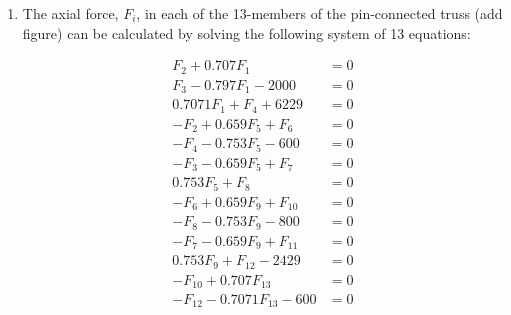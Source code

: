 \begin{fullwidth}
\begin{enumerate}[resume]
\item The axial force, $F_i$, in each of the 13-members of the pin-connected truss (add figure) can be calculated by solving the following system of 13 equations:

\begin{align*}
F_2 + 0.707 F_1 &= 0 \\
F_3 - 0.797 F_1 - 2000 &= 0 \\
0.7071 F_1 + F_4 + 6229 &= 0 \\
-F_2 + 0.659F_5 + F_6 &= 0 \\
-F_4 - 0.753 F_5 - 600 &= 0 \\
-F_3 - 0.659 F_5 + F_7 &= 0 \\
0.753 F_5 + F_8 &= 0 \\
-F_6 + 0.659 F_9 + F_{10} &= 0 \\
-F_8 - 0.753 F_9 - 800 &= 0 \\
-F_7 -0.659 F_9 + F_{11} &= 0 \\
0.753F_9 + F_{12} - 2429 &= 0 \\
-F_{10} + 0.707 F_{13} &= 0 \\
-F_{12} - 0.7071 F_{13} - 600 &= 0
\end{align*}




\end{enumerate}

\end{fullwidth}
